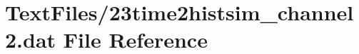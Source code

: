 \hypertarget{23time2histsim__channel2_8dat}{}\section{Text\+Files/23time2histsim\+\_\+channel2.dat File Reference}
\label{23time2histsim__channel2_8dat}
